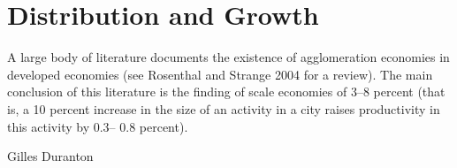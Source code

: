 \chapter{Distribution and Growth} \label{chapter-distribution}

\epigraph{A large body of literature documents the existence of agglomeration economies in developed economies (see Rosenthal and Strange 2004 for a review). The main conclusion of this literature is the finding of scale economies of 3–8 percent (that is, a 10 percent increase in the size of an activity in a city raises productivity in this activity by 0.3– 0.8 percent).}{Gilles Duranton \cite{durantonAreCitiesEngines2009}} 



